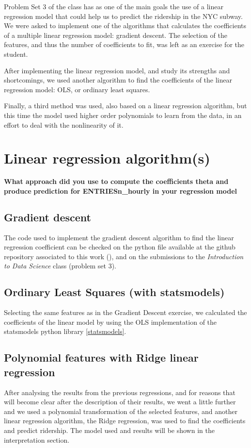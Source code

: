 \documentclass[a4paper,12pt,english]{sphinxmanual}
\begin{document}
Problem Set 3 of the class has as one of the main goals the use of a linear
regression model that could help us to predict the ridership in the NYC subway.
We were asked to implement one of the algorithms that calculates the
coefficients of a multiple linear regression model: gradient descent. The
selection of the features, and thus the number of coefficients to fit, was left
as an exercise for the student.

After implementing the linear regression model, and study its strengths and
shortcomings, we used another algorithm to find the coefficients of the linear
regression model: OLS, or ordinary least squares.

Finally, a third method was used, also based on a linear regression algorithm,
but this time the model used higher order polynomials to learn from the data,
in an effort to deal with the nonlinearity of it.


\section{Linear regression algorithm(s)}
\label{section2:linear-regression-algorithm-s}
\textbf{What approach did you use to compute the coefficients theta and produce}
\textbf{prediction for ENTRIESn\_hourly in your regression model}


\subsection{Gradient descent}
\label{section2:gradient-descent}
The code used to implement the gradient descent algorithm to find the linear
regression coefficient can be checked on the python file available at the
github repository associated to this work (), and on the
submissions to the \emph{Introduction to Data Science} class (problem set 3).


\subsection{Ordinary Least Squares (with statsmodels)}
\label{section2:ordinary-least-squares-with-statsmodels}
Selecting the same features as in the Gradient Descent exercise, we calculated
the coefficients of the linear model by using the OLS implementation of the
statsmodels python library {\hyperref[overview:statsmodels]{{[}statsmodels{]}}}.


\subsection{Polynomial features with Ridge linear regression}
\label{section2:polynomial-features-with-ridge-linear-regression}
After analysing the results from the previous regressions, and for reasons that
will become clear after the description of their results, we went a little
further and we used a polynomial transformation of the selected features, and
another linear regression algorithm, the Ridge regression, was used to find the
coefficients and predict ridership. The model used and results will be shown in
the interpretation section.
\end{document}
